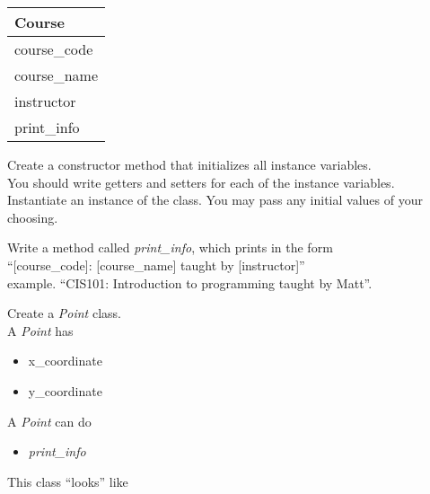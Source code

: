 \documentclass{article}
\newcommand{\tab}{\hspace*{0.25in}}
\begin{document}
\begin{enumerate}
\begin{minipage}{.4\textwidth}
		\vspace*{1em}
		\begin{tabular}{|l|}
			\hline Course\\ \hline
			course\_code\\ course\_name\\ instructor\\ \hline
			print\_info\\  \hline
		\end{tabular}
	\end{minipage}

	\vspace*{2ex}
	Create a constructor method that initializes all instance variables.\\
	You should write getters and setters for each of the instance variables.\\
	Instantiate an instance of the class. You may pass any initial values of your choosing.

	Write a method called \textit{print\_info}, which prints in the form \\
		\tab \tab \tab ``[course\_code]: [course\_name] taught by [instructor]''\\
	example. ``CIS101: Introduction to programming taught by Matt''.\\




	\begin{minipage}{.6\textwidth}
	\item Create a \textit{Point} class.\\		
		A \textit{Point} has
		\begin{itemize}
			\item x\_coordinate 
			\item y\_coordinate 
		\end{itemize}

		A \textit{Point} can do
		\begin{itemize}
			\item \textit{print\_info}
		\end{itemize}
	\end{minipage}
	\begin{minipage}{.4\textwidth}
		This class ``looks'' like 
				

\end{minipage}
\end{enumerate}
\end{document}
